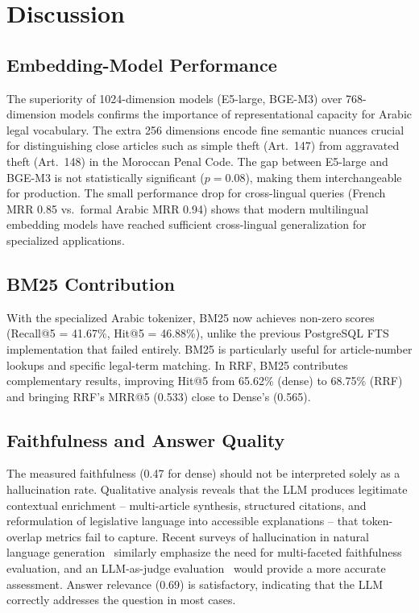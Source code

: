 \section{Discussion}
\label{sec:discussion}

\subsection{Embedding-Model Performance}

The superiority of 1024-dimension models (E5-large, BGE-M3) over 768-dimension
models confirms the importance of representational capacity for Arabic legal
vocabulary. The extra 256 dimensions encode fine semantic nuances crucial for
distinguishing close articles such as simple theft (Art.~147) from aggravated
theft (Art.~148) in the Moroccan Penal Code. The gap between E5-large and
BGE-M3 is not statistically significant ($p = 0.08$), making them
interchangeable for production. The small performance drop for cross-lingual
queries (French MRR 0.85 vs.\ formal Arabic MRR 0.94) shows that modern
multilingual embedding models have reached sufficient cross-lingual
generalization for specialized applications.

\subsection{BM25 Contribution}

With the specialized Arabic tokenizer, BM25 now achieves non-zero scores
(Recall@5 = 41.67\%, Hit@5 = 46.88\%), unlike the previous PostgreSQL FTS
implementation that failed entirely. BM25 is particularly useful for
article-number lookups and specific legal-term matching. In RRF, BM25
contributes complementary results, improving Hit@5 from 65.62\% (dense) to
68.75\% (RRF) and bringing RRF's MRR@5 (0.533) close to Dense's (0.565).

\subsection{Faithfulness and Answer Quality}

The measured faithfulness (0.47 for dense) should not be interpreted solely as
a hallucination rate. Qualitative analysis reveals that the LLM produces
legitimate contextual enrichment -- multi-article synthesis, structured
citations, and reformulation of legislative language into accessible
explanations -- that token-overlap metrics fail to capture. Recent surveys of hallucination
in natural language generation~\cite{ji2023survey} similarly emphasize the
need for multi-faceted faithfulness evaluation, and an
LLM-as-judge evaluation~\cite{gao2023faithful} would provide a more accurate
assessment. Answer relevance (0.69) is satisfactory, indicating that the LLM
correctly addresses the question in most cases.


